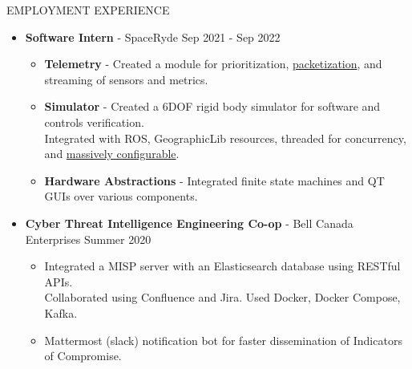 \documentclass{resume} %
\begin{document}
\begin{rSection}{EMPLOYMENT EXPERIENCE}
    \begin{itemize}
        \item {\bf Software Intern} - SpaceRyde \hfill {Sep 2021 - Sep 2022}
        \begin{itemize}[topsep=-10pt]
            \setlength\itemsep{-0.35em}
            \item[\textbullet] {\bf Telemetry} - Created a module for prioritization, \href{http://libtins.github.io/}{packetization}, and streaming of sensors and metrics.
            \item[\textbullet] {\bf Simulator} - Created a 6DOF rigid body simulator for software and controls verification.\\
            Integrated with ROS, GeographicLib resources, threaded for concurrency, and \href{https://github.com/jbeder/yaml-cpp}{massively configurable}.
            \item[\textbullet] {\bf Hardware Abstractions} - Integrated finite state machines and QT GUIs over various components. 
        \end{itemize}
        \item {\bf Cyber Threat Intelligence Engineering Co-op} - Bell Canada Enterprises \hfill {Summer 2020}
        \begin{itemize}[topsep=-10pt]
            \setlength\itemsep{-0.35em}
            \item[\textbullet] Integrated a MISP server with an Elasticsearch database using RESTful APIs.\\
            Collaborated using Confluence and Jira. Used Docker, Docker Compose, Kafka.
            \item[\textbullet] Mattermost (slack) notification bot for faster dissemination of Indicators of Compromise.
        \end{itemize}
    \end{itemize}
\end{rSection}
\end{document}
